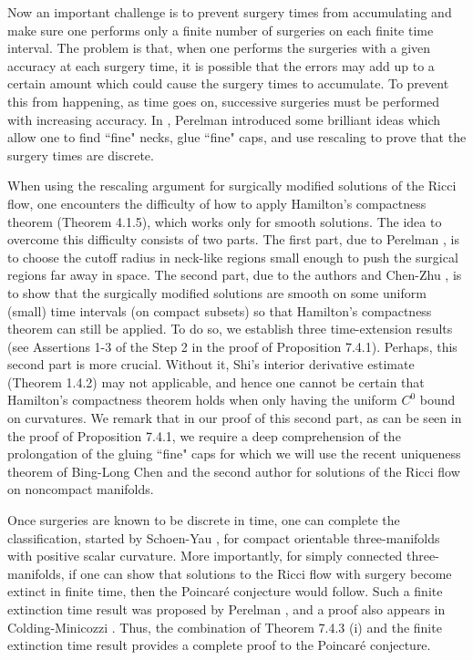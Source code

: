 Now an important challenge is to prevent surgery times from
accumulating and make sure one performs only a finite number of
surgeries on each finite time interval. The problem is that, when
one performs the surgeries with a given accuracy at each surgery
time, it is possible that the errors may add up to a certain
amount which could cause the surgery times to accumulate. To
prevent this from happening, as time goes on, successive surgeries
must be performed with increasing accuracy. In \cite{P2}, Perelman
introduced some brilliant ideas which allow one to find ``fine"
necks, glue ``fine" caps, and use rescaling to prove that the
surgery times are discrete.

When using the rescaling argument for surgically modified
solutions of the Ricci flow, one encounters the difficulty of how
to apply Hamilton's compactness theorem (Theorem 4.1.5), which
works only for smooth solutions. The idea to overcome this
difficulty consists of two parts. The first part, due to Perelman
\cite{P2}, is to choose the cutoff radius in neck-like regions
small enough to push the surgical regions far away in space. The
second part, due to the authors and Chen-Zhu \cite{CZ05F}, is to
show that the surgically modified solutions are smooth on some
uniform (small) time intervals (on compact subsets) so that
Hamilton's compactness theorem can still be applied. To do so, we
establish three time-extension results (see Assertions 1-3 of the
Step 2 in the proof of Proposition 7.4.1). Perhaps, this second
part is more crucial. Without it, Shi's interior derivative
estimate (Theorem 1.4.2) may not applicable, and hence one cannot
be certain that Hamilton's compactness theorem holds when only
having the uniform $C^{0}$ bound on curvatures. We remark that in
our proof of this second part, as can be seen in the proof of
Proposition 7.4.1, we require a deep comprehension of the
prolongation of the gluing ``fine" caps for which we will use the
recent uniqueness theorem of Bing-Long Chen and the second author
\cite{CZ05U} for solutions of the Ricci flow on noncompact
manifolds.

Once surgeries are known to be discrete in time, one can complete
the classification, started by Schoen-Yau \cite{ScY79m, ScY79},
for compact orientable three-manifolds with positive scalar
curvature. More importantly, for simply connected three-manifolds,
if one can show that solutions to the Ricci flow with surgery
become extinct in finite time, then the Poincar\'e conjecture
would follow. Such a finite extinction time result was proposed by
Perelman \cite{P3}, and a proof also appears in Colding-Minicozzi
\cite{CM}. Thus, the combination of Theorem 7.4.3 (i) and the
finite extinction time result provides a complete proof to the
Poincar\'e conjecture.

